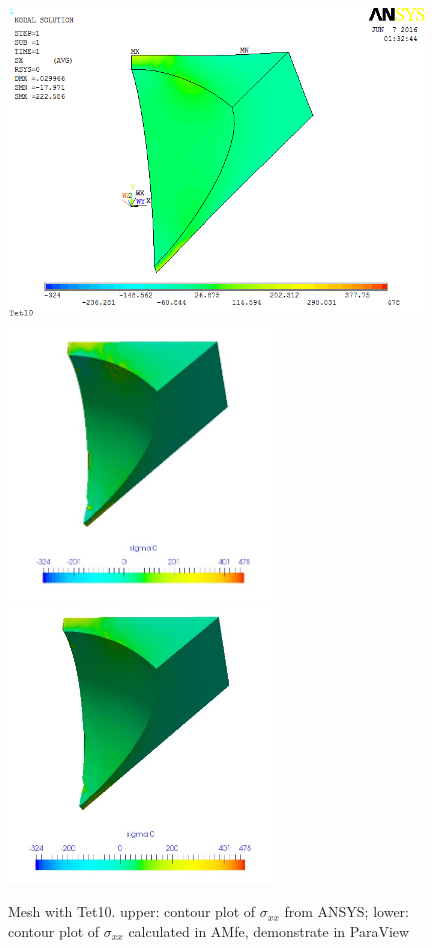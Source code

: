\begin{figure}[htbp]
	\begin{center}
		\includegraphics[width=11cm,clip]{Tet10_Sxx.png} 	
		\includegraphics[width=7cm,clip]{Tet10_Sxx_PD.png} 			
		\includegraphics[width=7cm,clip]{Tet10_Sxx_P.png} 		
		\caption{Mesh with Tet10. upper: contour plot of $\sigma_{xx}$ from ANSYS; lower: contour plot of $\sigma_{xx}$ calculated in AMfe, demonstrate in ParaView} \label{fig: Tet10_Sxx}
	\end{center}
\end{figure}
\clearpage 

